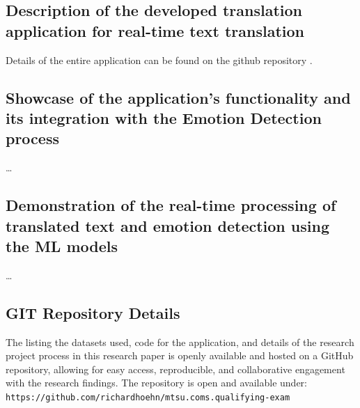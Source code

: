 \documentclass[11pt]{article}
\begin{document}
\subsection{Description of the developed translation application for real-time text translation}
Details of the entire application can be found on the github repository \cite{Hoehn_Improving_Emotion_Detection_2023}.

\subsection{Showcase of the application's functionality and its integration with the Emotion Detection process}
\ldots

\subsection{Demonstration of the real-time processing of translated text and emotion detection using the ML models}
\ldots

\subsection{GIT Repository Details}
The listing the datasets used, code for the application, and details of the research project process in this research paper is openly available and hosted on a GitHub repository, allowing for easy access, reproducible, and collaborative engagement with the research findings. The repository is open and available under: \texttt{https://github.com/richardhoehn/mtsu.coms.qualifying-exam}\cite{Hoehn_Improving_Emotion_Detection_2023}
\clearpage


\printbibliography
\clearpage


\listoffigures
\clearpage

\appendix
\end{document}

